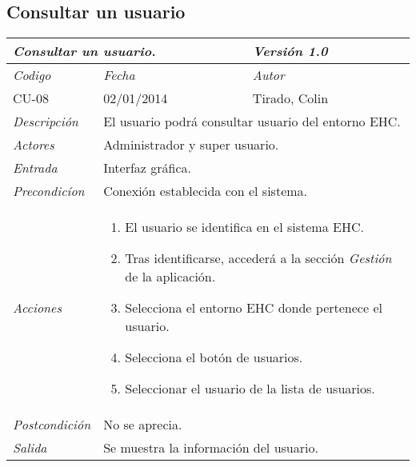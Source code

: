\subsection{Consultar un usuario}
\begin{center}
    \begin{tabular}{|p{3cm}|p{4cm}|p{4cm}|p{4cm}|}
    \hline \multicolumn{3}{|p{9cm}|}{\textit{Consultar un usuario.}} & \textit{Versi\'on 1.0} \\
	\hline \textit{Codigo} & \textit{Fecha} & \multicolumn{2}{|p{6cm}|}{\textit{Autor}} \\
	CU-08 & 02/01/2014 & \multicolumn{2}{|p{6cm}|}{Tirado, Colin} \\		
    \hline \textit{Descripci\'on} & \multicolumn{3}{|p{9cm}|}{El usuario podr\'a consultar usuario del entorno EHC.} \\
    \hline \textit{Actores} & \multicolumn{3}{|p{9cm}|}{Administrador y super usuario.} \\
    \hline \textit{Entrada} & \multicolumn{3}{|p{9cm}|}{Interfaz gr\'afica.} \\
    \hline \textit{Precondic\'ion} & \multicolumn{3}{|p{9cm}|}{Conexi\'on establecida con el sistema.} \\
    \hline \textit{Acciones} & \multicolumn{3}{|p{9cm}|}{
        \begin{enumerate}
        \item El usuario se identifica en el sistema EHC.
        \item Tras identificarse, acceder\'a a la secci\'on \textit{Gesti\'on} de la aplicaci\'on.
        \item Selecciona el entorno EHC donde pertenece el usuario.
        \item Selecciona el bot\'on de usuarios.
        \item Seleccionar el usuario de la lista de usuarios.
        \end{enumerate}
	} \\
    \hline \textit{Postcondici\'on} & \multicolumn{3}{|p{9cm}|}{No se aprecia.} \\
    \hline \textit{Salida} & \multicolumn{3}{|p{9cm}|}{Se muestra la informaci\'on del usuario.} \\ \hline
    \end{tabular}
\end{center}